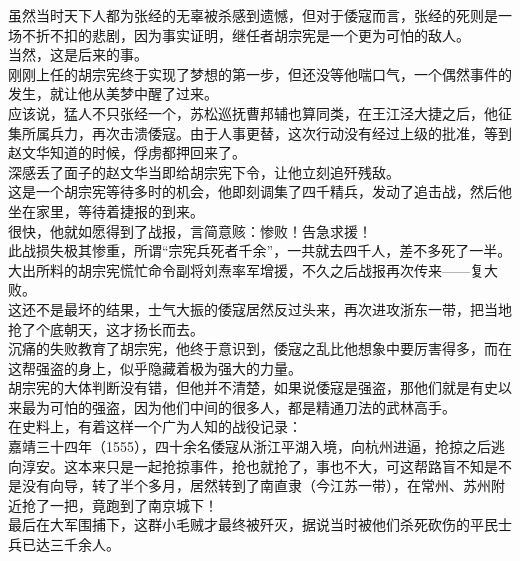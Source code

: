 \begin{multicols}{\theparacolNo}
虽然当时天下人都为张经的无辜被杀感到遗憾，但对于倭寇而言，张经的死则是一场不折不扣的悲剧，因为事实证明，继任者胡宗宪是一个更为可怕的敌人。\\

当然，这是后来的事。\\

刚刚上任的胡宗宪终于实现了梦想的第一步，但还没等他喘口气，一个偶然事件的发生，就让他从美梦中醒了过来。\\

应该说，猛人不只张经一个，苏松巡抚曹邦辅也算同类，在王江泾大捷之后，他征集所属兵力，再次击溃倭寇。由于人事更替，这次行动没有经过上级的批准，等到赵文华知道的时候，俘虏都押回来了。\\

深感丢了面子的赵文华当即给胡宗宪下令，让他立刻追歼残敌。\\

这是一个胡宗宪等待多时的机会，他即刻调集了四千精兵，发动了追击战，然后他坐在家里，等待着捷报的到来。\\

很快，他就如愿得到了战报，言简意赅：惨败！告急求援！\\

此战损失极其惨重，所谓“宗宪兵死者千余”，一共就去四千人，差不多死了一半。大出所料的胡宗宪慌忙命令副将刘焘率军增援，不久之后战报再次传来——复大败。\\

这还不是最坏的结果，士气大振的倭寇居然反过头来，再次进攻浙东一带，把当地抢了个底朝天，这才扬长而去。\\

沉痛的失败教育了胡宗宪，他终于意识到，倭寇之乱比他想象中要厉害得多，而在这帮强盗的身上，似乎隐藏着极为强大的力量。\\

胡宗宪的大体判断没有错，但他并不清楚，如果说倭寇是强盗，那他们就是有史以来最为可怕的强盗，因为他们中间的很多人，都是精通刀法的武林高手。\\

在史料上，有着这样一个广为人知的战役记录：\\

嘉靖三十四年（1555），四十余名倭寇从浙江平湖入境，向杭州进逼，抢掠之后逃向淳安。这本来只是一起抢掠事件，抢也就抢了，事也不大，可这帮路盲不知是不是没有向导，转了半个多月，居然转到了南直隶（今江苏一带），在常州、苏州附近抢了一把，竟跑到了南京城下！\\

最后在大军围捕下，这群小毛贼才最终被歼灭，据说当时被他们杀死砍伤的平民士兵已达三千余人。\\


\end{multicols}
